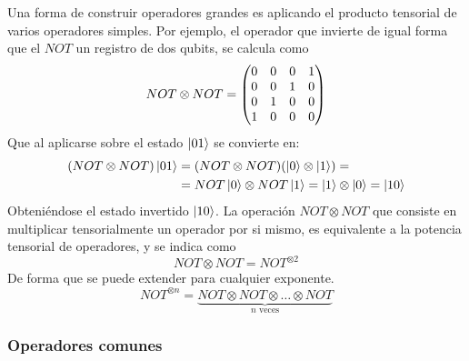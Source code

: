 Una forma de construir operadores grandes es aplicando el producto tensorial de 
varios operadores simples. Por ejemplo, el operador que invierte de igual forma 
que el $NOT$ un registro de dos qubits, se calcula como
%
$$ NOT \otimes NOT = \begin{pmatrix} 0&0&0&1\\ 0&0&1&0 \\ 0&1&0&0 \\ 1&0&0&0 \end{pmatrix}$$
%
Que al aplicarse sobre el estado $\ket{01}$ se convierte en:
%
\begin{equation*}
\begin{split}
(NOT \otimes NOT) \ket{01} &= (NOT \otimes NOT) (\ket{0} \otimes \ket{1}) =\\
& = NOT \ket{0} \otimes NOT \ket{1} = \ket{1} \otimes \ket{0} = \ket{10}
\end{split}
\end{equation*}
%
Obteniéndose el estado invertido $\ket{10}$. La operación $NOT \otimes NOT$ que 
consiste en multiplicar tensorialmente un operador por si mismo, es equivalente 
a la potencia tensorial de operadores, y se indica como
%
$$ NOT \otimes NOT = NOT^{\otimes 2} $$
%
De forma que se puede extender para cualquier exponente.
%
$$ NOT^{\otimes n} = \underbrace{NOT\otimes NOT\otimes \ldots \otimes NOT}_{n 
\text{ veces}}$$
%

\subsubsection{Operadores comunes}

